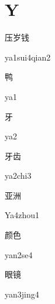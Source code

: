 ﻿%
\section*{Y}
\begin{multicols*}{2}

\begin{verbete}{压岁钱}
\begin{pronuncia}{ya1sui4qian2}
\end{pronuncia}
\end{verbete}

\begin{verbete}[ya1]{鸭}
\begin{pronuncia}{ya1}
\end{pronuncia}
\end{verbete}

\begin{verbete}[ya2]{牙}
\begin{pronuncia}{ya2}
\end{pronuncia}
\end{verbete}

\begin{verbete}[ya2chi3]{牙齿}
\begin{pronuncia}{ya2chi3}
\end{pronuncia}
\end{verbete}

\begin{verbete}[Ya4zhou1]{亚洲}
\begin{pronuncia}{Ya4zhou1}
\end{pronuncia}
\end{verbete}

\begin{verbete}[yan2se4]{颜色}
\begin{pronuncia}{yan2se4}
\end{pronuncia}
\end{verbete}

\begin{verbete}{眼镜}
\begin{pronuncia}{yan3jing4}
\end{pronuncia}
\end{verbete}


\end{multicols*}
